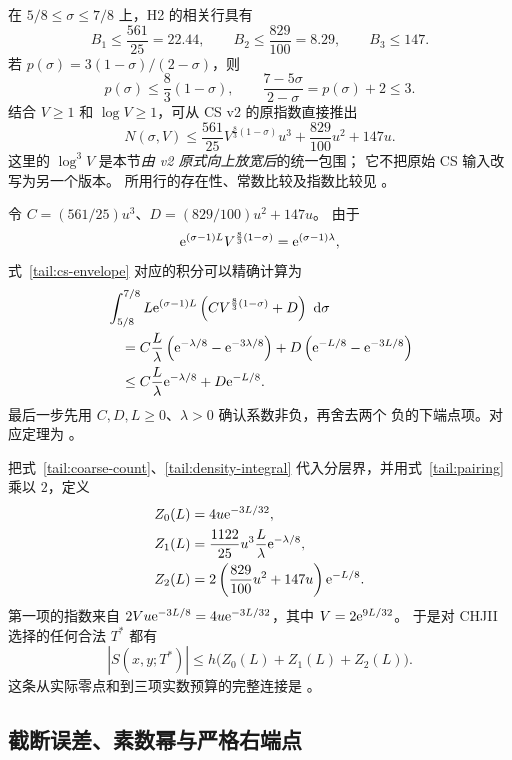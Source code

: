 在 $5/8\leq\sigma\leq7/8$ 上，H2 的相关行具有
\[
 B_1\leq\frac{561}{25}=22.44,\qquad
 B_2\leq\frac{829}{100}=8.29,\qquad B_3\leq147.
\]
若 $p(\sigma)=3(1-\sigma)/(2-\sigma)$，则
\[
 p(\sigma)\leq\frac83(1-\sigma),\qquad
 \frac{7-5\sigma}{2-\sigma}=p(\sigma)+2\leq3.
\]
结合 $V\geq1$ 和 $\log V\geq1$，可从 CS v2 的原指数直接推出
\begin{equation}\label{tail:cs-envelope}
 N(\sigma,V)\leq
 \frac{561}{25}V^{\frac83(1-\sigma)}u^3
 +\frac{829}{100}u^2+147u.
\end{equation}
这里的 $\log^3 V$ 是本节\emph{由 v2 原式向上放宽后}的统一包围；
它不把原始 CS 输入改写为另一个版本。
所用行的存在性、常数比较及指数比较见
。

令 $C=(561/25)u^3$、$D=(829/100)u^2+147u$。
由于
\[
 \mathrm e^{(\sigma-1)L}V^{\frac83(1-\sigma)}
 =\mathrm e^{(\sigma-1)\lambda},
\]
式~\eqref{tail:cs-envelope} 对应的积分可以精确计算为
\begin{align}
 &\int_{5/8}^{7/8}L\mathrm e^{(\sigma-1)L}
 \left(CV^{\frac83(1-\sigma)}+D\right)\,\,\mathrm d\sigma\notag\\
 &\quad=C\frac{L}{\lambda}
      \left(\mathrm e^{-\lambda/8}-\mathrm e^{-3\lambda/8}\right)
       +D\left(\mathrm e^{-L/8}-\mathrm e^{-3L/8}\right)\notag\\
 &\quad\leq C\frac{L}{\lambda}\mathrm e^{-\lambda/8}+D\mathrm e^{-L/8}.
 \label{tail:density-integral}
\end{align}
最后一步先用 $C,D,L\geq0$、$\lambda>0$ 确认系数非负，再舍去两个
负的下端点项。对应定理为
。

把式~\eqref{tail:coarse-count}、\eqref{tail:density-integral}
代入分层界，并用式~\eqref{tail:pairing} 乘以 $2$，定义
\begin{align}
 Z_0(L)&=4u\mathrm e^{-3L/32},\label{tail:Z0}\\
 Z_1(L)&=\frac{1122}{25}u^3\frac{L}{\lambda}\mathrm e^{-\lambda/8},
 \label{tail:Z1}\\
 Z_2(L)&=2\left(\frac{829}{100}u^2+147u\right)\mathrm e^{-L/8}.
 \label{tail:Z2}
\end{align}
第一项的指数来自
$2V u\mathrm e^{-3L/8}=4u\mathrm e^{-3L/32}$，其中 $V=2\mathrm e^{9L/32}$。
于是对 CHJII 选择的任何合法 $T^*$ 都有
\begin{equation}\label{tail:zero-bound}
 |S(x,y;T^*)|\leq h\bigl(Z_0(L)+Z_1(L)+Z_2(L)\bigr).
\end{equation}
这条从实际零点和到三项实数预算的完整连接是
。

\subsection{截断误差、素数幂与严格右端点}

